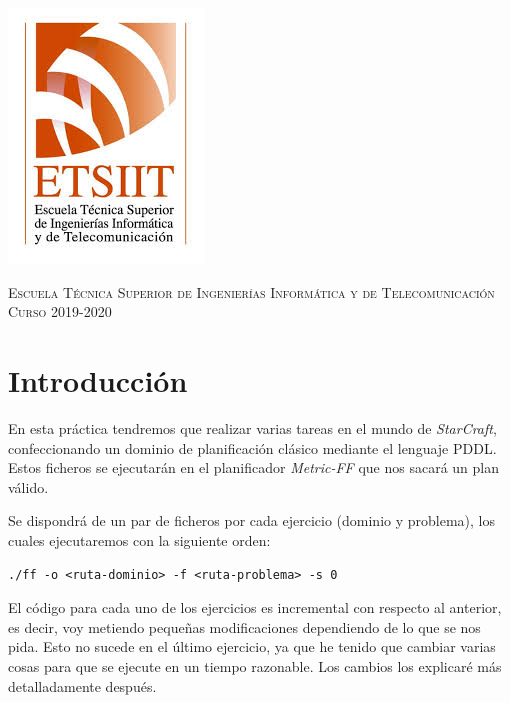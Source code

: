 \documentclass[11pt,a4paper]{article}
\begin{document}
\begin{titlepage}
\begin{minipage}{\textwidth}
\includegraphics[scale=0.3]{img/etsiit.jpeg}

\vspace{0.7cm}
\textsc{Escuela Técnica Superior de Ingenierías Informática y de Telecomunicación}\\
\vspace{1cm}
\textsc{Curso 2019-2020}
\end{minipage}
\end{titlepage}

\tableofcontents
\thispagestyle{empty}				%

\newpage

\setlength{\parskip}{1em}
\setcounter{page}{1}

\section*{Introducción}
En esta práctica tendremos que realizar varias tareas en el mundo de \textit{StarCraft}, confeccionando un dominio de planificación
clásico mediante el lenguaje PDDL. Estos ficheros se ejecutarán en el planificador \textit{Metric-FF} que nos sacará un plan válido.

Se dispondrá de un par de ficheros por cada ejercicio (dominio y problema), los cuales ejecutaremos con la siguiente orden:
\vspace{-8px}
\begin{center}
    \texttt{./ff -o <ruta-dominio> -f <ruta-problema> -s 0}
\end{center}

El código para cada uno de los ejercicios es incremental con respecto al anterior, es decir, voy metiendo pequeñas modificaciones
dependiendo de lo que se nos pida. Esto no sucede en el último ejercicio, ya que he tenido que cambiar varias cosas para que se
ejecute en un tiempo razonable. Los cambios los explicaré más detalladamente después.
\end{document}
